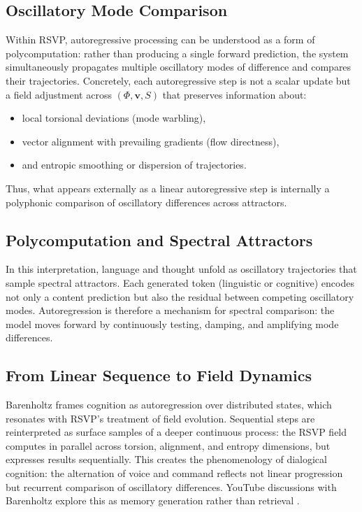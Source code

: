 \documentclass[a4paper,11pt]{article}
\begin{document}
\subsection{Oscillatory Mode Comparison}
Within RSVP, autoregressive processing can be understood as a form of polycomputation: rather than producing a single forward prediction, the system simultaneously propagates multiple oscillatory modes of difference and compares their trajectories. Concretely, each autoregressive step is not a scalar update but a field adjustment across $(\Phi,\mathbf{v},S)$ that preserves information about:
\begin{itemize}
    \item local torsional deviations (mode warbling),
    \item vector alignment with prevailing gradients (flow directness),
    \item and entropic smoothing or dispersion of trajectories.
\end{itemize}
Thus, what appears externally as a linear autoregressive step is internally a polyphonic comparison of oscillatory differences across attractors.

\subsection{Polycomputation and Spectral Attractors}
In this interpretation, language and thought unfold as oscillatory trajectories that sample spectral attractors. Each generated token (linguistic or cognitive) encodes not only a content prediction but also the residual between competing oscillatory modes. Autoregression is therefore a mechanism for spectral comparison: the model moves forward by continuously testing, damping, and amplifying mode differences.

\subsection{From Linear Sequence to Field Dynamics}
Barenholtz frames cognition as autoregression over distributed states, which resonates with RSVP’s treatment of field evolution. Sequential steps are reinterpreted as surface samples of a deeper continuous process: the RSVP field computes in parallel across torsion, alignment, and entropy dimensions, but expresses results sequentially. This creates the phenomenology of dialogical cognition: the alternation of voice and command reflects not linear progression but recurrent comparison of oscillatory differences. YouTube discussions with Barenholtz explore this as memory generation rather than retrieval \citep{barenholtzautogeneration}.
\end{document}
